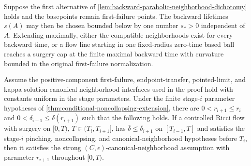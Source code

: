 \begin{lemma}
\label{lem:uniform-backward-lifetime}
\notready
Suppose the first alternative of
\ref{lem:backward-parabolic-neighborhood-dichotomy} holds and the basepoints
remain first-failure points.  The backward lifetimes $s(A)$ may then be
chosen bounded below by one number $s_*>0$ independent of $A$.  Extending
maximally, either the compatible neighborhoods exist for every backward
time, or a flow line starting in one fixed-radius zero-time based ball
reaches a surgery cap at the finite maximal backward time with curvature
bounded in the original first-failure normalization.
\end{lemma}

\begin{theorem}
\label{thm:strong-canonical-neighborhood-extension}
\notready
Assume the positive-component first-failure, endpoint-transfer, pointed-limit,
and kappa-solution canonical-neighborhood interfaces used in the proof hold
with constants uniform in the stage parameters.
Under the finite stage-$i$ parameter hypotheses of
\ref{thm:conditional-noncollapsing-extension}, there are
$0<r_{i+1}\le r_i$ and
$0<\delta_{i+1}\le\delta(r_{i+1})$ such that the following holds.  If a
controlled Ricci flow with surgery on $[0,T)$,
$T\in(T_i,T_{i+1}]$, has $\bar\delta\le\delta_{i+1}$ on
$[T_{i-1},T]$ and satisfies the stage-$i$ pinching, noncollapsing, and
canonical-neighborhood hypotheses before $T_i$, then it satisfies the strong
$(C,\epsilon)$-canonical-neighborhood assumption with parameter
$r_{i+1}$ throughout $[0,T)$.
\end{theorem}

